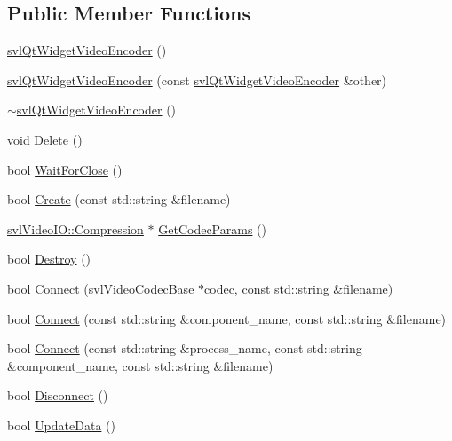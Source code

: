 \subsection*{Public Member Functions}
\begin{DoxyCompactItemize}
\item 
\hyperlink{classsvl_qt_widget_video_encoder_a43bc3fcd8b3283a120f1eb208f2629a9}{svl\+Qt\+Widget\+Video\+Encoder} ()
\item 
\hyperlink{classsvl_qt_widget_video_encoder_af512ab260868ebba43079be4402c33f8}{svl\+Qt\+Widget\+Video\+Encoder} (const \hyperlink{classsvl_qt_widget_video_encoder}{svl\+Qt\+Widget\+Video\+Encoder} \&other)
\item 
\hyperlink{classsvl_qt_widget_video_encoder_a3b974deb575a42c92e96cc60972ce6f7}{$\sim$svl\+Qt\+Widget\+Video\+Encoder} ()
\item 
void \hyperlink{classsvl_qt_widget_video_encoder_ae4af0a601c5fe578616ad09b251b4119}{Delete} ()
\item 
bool \hyperlink{classsvl_qt_widget_video_encoder_a4655de59f178c4688ca4fd693221b187}{Wait\+For\+Close} ()
\item 
bool \hyperlink{classsvl_qt_widget_video_encoder_ac01a158f6afc0310172cb4a107d8c5d4}{Create} (const std\+::string \&filename)
\item 
\hyperlink{classsvl_video_i_o_a932d071ec9be4fefde824ab9b9125282}{svl\+Video\+I\+O\+::\+Compression} $\ast$ \hyperlink{classsvl_qt_widget_video_encoder_aa1e039036a6fd6ba95d88173c0419d5e}{Get\+Codec\+Params} ()
\item 
bool \hyperlink{classsvl_qt_widget_video_encoder_a25567b646761062b3d32f25bdd21d0df}{Destroy} ()
\item 
bool \hyperlink{classsvl_qt_widget_video_encoder_a880c4ccc20b37e438510daa4fc30e628}{Connect} (\hyperlink{classsvl_video_codec_base}{svl\+Video\+Codec\+Base} $\ast$codec, const std\+::string \&filename)
\item 
bool \hyperlink{classsvl_qt_widget_video_encoder_a2fbfcf1ba24bb98b299e32a55b7ec84d}{Connect} (const std\+::string \&component\+\_\+name, const std\+::string \&filename)
\item 
bool \hyperlink{classsvl_qt_widget_video_encoder_a7ef3026c2087b14b3d8ff46533d63706}{Connect} (const std\+::string \&process\+\_\+name, const std\+::string \&component\+\_\+name, const std\+::string \&filename)
\item 
bool \hyperlink{classsvl_qt_widget_video_encoder_a8915429476e1d0f82236d6d6628efa7a}{Disconnect} ()
\item 
bool \hyperlink{classsvl_qt_widget_video_encoder_a16d010418b92aaa354ac712481a8ce79}{Update\+Data} ()
\end{DoxyCompactItemize}
